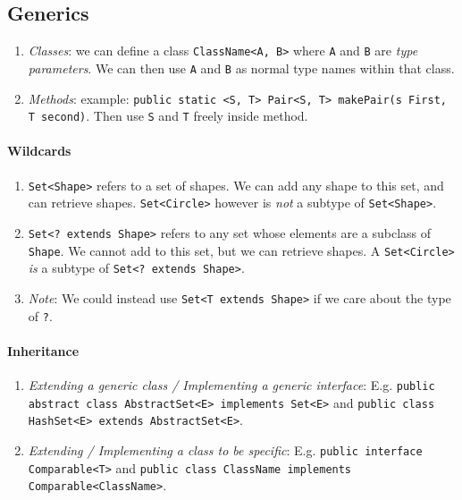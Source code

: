 \documentclass[twocolumn,english]{article}
\begin{document}
\subsection{Generics}
\begin{enumerate}
\item \emph{Classes}: we can define a class \texttt{ClassName\textless{}A,
B\textgreater{}} where \texttt{A} and \texttt{B} are \emph{type parameters}.
We can then use \texttt{A} and \texttt{B} as normal type names within
that class.
\item \emph{Methods}: example: \texttt{public static \textless{}S, T\textgreater{}
Pair\textless{}S, T\textgreater{} makePair(s First, T second)}. Then
use \texttt{S} and \texttt{T} freely inside method.
\end{enumerate}

\paragraph{Wildcards}
\begin{enumerate}
\item \texttt{Set\textless{}Shape\textgreater{}} refers to a set of shapes.
We can add any shape to this set, and can retrieve shapes. \texttt{Set\textless{}Circle\textgreater{}}
however is \emph{not} a subtype of \texttt{Set\textless{}Shape\textgreater{}}.
\item \texttt{Set\textless{}? extends Shape\textgreater{}} refers to any
set whose elements are a subclass of \texttt{Shape}. We cannot add
to this set, but we can retrieve shapes. A \texttt{Set\textless{}Circle\textgreater{}}
\emph{is} a subtype of \texttt{Set\textless{}? extends Shape\textgreater{}}.
\item \emph{Note}: We could instead use \texttt{Set\textless{}T extends
Shape\textgreater{}} if we care about the type of \texttt{?}.
\end{enumerate}

\paragraph{Inheritance}
\begin{enumerate}
\item \emph{Extending a generic class / Implementing a generic interface}:
E.g. \texttt{public abstract class AbstractSet\textless{}E\textgreater{}
implements Set\textless{}E\textgreater{}} and \texttt{public class
HashSet\textless{}E\textgreater{} extends AbstractSet\textless{}E\textgreater{}}.
\item \emph{Extending / Implementing a class to be specific}: E.g. \texttt{public
interface Comparable\textless{}T\textgreater{}} and \texttt{public
class ClassName implements Comparable\textless{}ClassName\textgreater{}}.
\end{enumerate}
\end{document}

